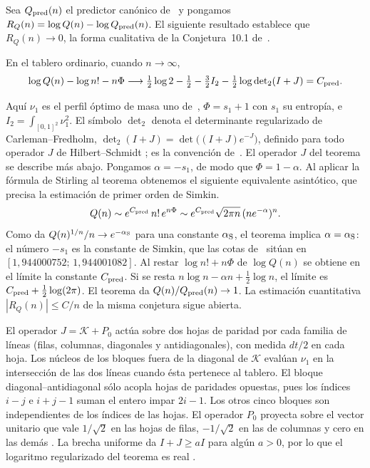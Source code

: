 Sea $Q_{\rm pred}(n)$ el predictor canónico de~\cite{pred} y pongamos
$R_Q(n)=\log Q(n)-\log Q_{\rm pred}(n)$. El siguiente resultado establece que
$R_Q(n)\to0$, la forma cualitativa de la Conjetura~10.1 de~\cite{pred}.
\begin{teorema}\label{princ}
En el tablero ordinario, cuando $n\to\infty$,
\[
 \log Q(n)-\log n!-n\Phi\longrightarrow
 \tfrac12\log2-\tfrac12-\tfrac32 I_2-\tfrac12\log{\det}_2(I+J)=C_{\rm pred}.
\]
\end{teorema}
Aquí $\nu_1$ es el perfil óptimo de masa uno de~\cite{perfil}, $\Phi=s_1+1$ con $s_1$ su entropía, e
$I_2=\int_{[0,1]^2}\nu_1^2$. El símbolo ${\det}_2$ denota el determinante regularizado de
Carleman--Fredholm, ${\det}_2(I+J)=\det\bigl((I+J)e^{-J}\bigr)$, definido para todo operador $J$ de
Hilbert--Schmidt \cite[cap.~9]{simon}; es la convención de~\cite[(D4.1)]{pred}. El operador $J$ del
teorema se describe más abajo.
Pongamos $\alpha=-s_1$, de modo que $\Phi=1-\alpha$. Al aplicar la
fórmula de Stirling al teorema obtenemos el siguiente equivalente asintótico, que precisa la
estimación de primer orden de Simkin.
\[
 Q(n)\sim e^{C_{\rm pred}}\,n!\,e^{n\Phi}
      \sim e^{C_{\rm pred}}\sqrt{2\pi n}\,(n e^{-\alpha})^n .
\]
Como \cite[Teorema~1.1]{simkin} da $Q(n)^{1/n}/n\to e^{-\alpha_{\rm S}}$ para una constante
$\alpha_{\rm S}$, el teorema implica $\alpha=\alpha_{\rm S}$: el número $-s_1$ es la constante de
Simkin, que las cotas de~\cite{nab} sitúan en $[1{,}944000752;\,1{,}944001082]$.
Al restar $\log n!+n\Phi$ de $\log Q(n)$ se obtiene en el límite la constante $C_{\rm pred}$. Si se
resta $n\log n-\alpha n+\tfrac12\log n$, el límite es $C_{\rm pred}+\tfrac12\log(2\pi)$.
El teorema da $Q(n)/Q_{\rm pred}(n)\to1$. La estimación cuantitativa $|R_Q(n)|\le C/n$ de la misma
conjetura sigue abierta.

El operador $J=\mathcal K+P_0$ actúa sobre dos hojas de paridad por cada familia de líneas (filas,
columnas, diagonales y antidiagonales), con medida $dt/2$ en cada hoja. Los núcleos de los bloques
fuera de la diagonal de $\mathcal K$ evalúan $\nu_1$ en la intersección de las dos líneas cuando ésta
pertenece al tablero. El bloque diagonal--antidiagonal sólo acopla hojas de paridades opuestas,
pues los índices $i-j$ e $i+j-1$ suman el entero impar $2i-1$. Los otros cinco bloques son
independientes de los índices de las hojas. El operador $P_0$ proyecta sobre el vector unitario que vale
$1/\sqrt2$ en las hojas de filas, $-1/\sqrt2$ en las de columnas y cero en las demás
\cite[\S5.3, (D3.4)--(D3.6)]{pred}. La brecha uniforme da $I+J\ge aI$ para algún $a>0$, por lo que
el logaritmo regularizado del teorema es real \cite[\S5.4, (D4.1)]{pred}.

